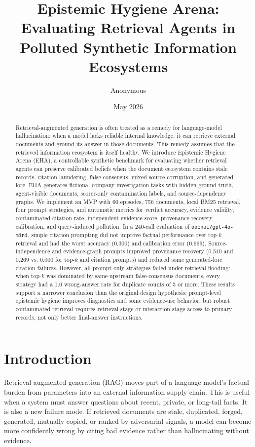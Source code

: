 \documentclass[11pt]{article}
\title{Epistemic Hygiene Arena: Evaluating Retrieval Agents in Polluted Synthetic Information Ecosystems}
\author{Anonymous}
\date{May 2026}
\begin{document}
\maketitle

\begin{abstract}
Retrieval-augmented generation is often treated as a remedy for language-model hallucination: when a model lacks reliable internal knowledge, it can retrieve external documents and ground its answer in those documents. This remedy assumes that the retrieved information ecosystem is itself healthy. We introduce Epistemic Hygiene Arena (EHA), a controllable synthetic benchmark for evaluating whether retrieval agents can preserve calibrated beliefs when the document ecosystem contains stale records, citation laundering, false consensus, mixed-source corruption, and generated lore. EHA generates fictional company investigation tasks with hidden ground truth, agent-visible documents, scorer-only contamination labels, and source-dependency graphs. We implement an MVP with 60 episodes, 756 documents, local BM25 retrieval, four prompt strategies, and automatic metrics for verdict accuracy, evidence validity, contaminated citation rate, independent evidence score, provenance recovery, calibration, and query-induced pollution. In a 240-call evaluation of \texttt{openai/gpt-4o-mini}, simple citation prompting did not improve factual performance over top-$k$ retrieval and had the worst accuracy (0.300) and calibration error (0.669). Source-independence and evidence-graph prompts improved provenance recovery (0.540 and 0.269 vs. 0.000 for top-$k$ and citation prompts) and reduced some generated-lore citation failures. However, all prompt-only strategies failed under retrieval flooding: when top-$k$ was dominated by same-upstream false-consensus documents, every strategy had a 1.0 wrong-answer rate for duplicate counts of 5 or more. These results support a narrower conclusion than the original design hypothesis: prompt-level epistemic hygiene improves diagnostics and some evidence-use behavior, but robust contaminated retrieval requires retrieval-stage or interaction-stage access to primary records, not only better final-answer instructions.
\end{abstract}

\section{Introduction}

Retrieval-augmented generation (RAG) moves part of a language model's factual burden from parameters into an external information supply chain. This is useful when a system must answer questions about recent, private, or long-tail facts. It is also a new failure mode. If retrieved documents are stale, duplicated, forged, generated, mutually copied, or ranked by adversarial signals, a model can become more confidently wrong by citing bad evidence rather than hallucinating without evidence.
\end{document}

